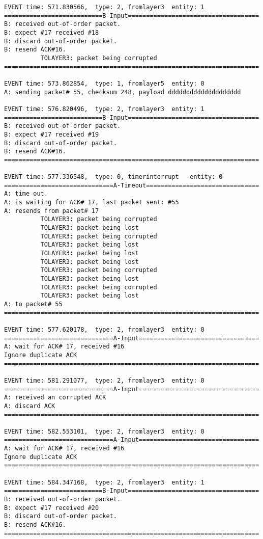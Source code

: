 \documentclass[12pt]{article}
\begin{document}
\begin{verbatim}
EVENT time: 571.830566,  type: 2, fromlayer3  entity: 1
===========================B-Input====================================
B: received out-of-order packet.
B: expect #17 received #18
B: discard out-of-order packet.
B: resend ACK#16.
          TOLAYER3: packet being corrupted
======================================================================

EVENT time: 573.862854,  type: 1, fromlayer5  entity: 0
A: sending packet# 55, checksum 248, payload dddddddddddddddddddd

EVENT time: 576.820496,  type: 2, fromlayer3  entity: 1
===========================B-Input====================================
B: received out-of-order packet.
B: expect #17 received #19
B: discard out-of-order packet.
B: resend ACK#16.
======================================================================

EVENT time: 577.336548,  type: 0, timerinterrupt   entity: 0
==============================A-Timeout===============================
A: time out. 
A: is waiting for ACK# 17, last packet sent: #55
A: resends from packet# 17 
          TOLAYER3: packet being corrupted
          TOLAYER3: packet being lost
          TOLAYER3: packet being corrupted
          TOLAYER3: packet being lost
          TOLAYER3: packet being lost
          TOLAYER3: packet being lost
          TOLAYER3: packet being corrupted
          TOLAYER3: packet being lost
          TOLAYER3: packet being corrupted
          TOLAYER3: packet being lost
A: to packet# 55
======================================================================

EVENT time: 577.620178,  type: 2, fromlayer3  entity: 0
==============================A-Input=================================
A: wait for ACK# 17, received #16
Ignore duplicate ACK
======================================================================

EVENT time: 581.291077,  type: 2, fromlayer3  entity: 0
==============================A-Input=================================
A: received an corrupted ACK 
A: discard ACK
======================================================================

EVENT time: 582.553101,  type: 2, fromlayer3  entity: 0
==============================A-Input=================================
A: wait for ACK# 17, received #16
Ignore duplicate ACK
======================================================================

EVENT time: 584.347168,  type: 2, fromlayer3  entity: 1
===========================B-Input====================================
B: received out-of-order packet.
B: expect #17 received #20
B: discard out-of-order packet.
B: resend ACK#16.
======================================================================


\end{verbatim}
\end{document}
